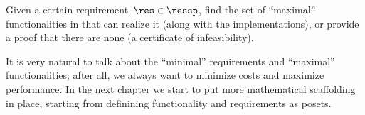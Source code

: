 \begin{problem}[FixReqMinFun]\label{pro:FixReqMinFun}
    Given a certain requirement~$\res\in\ressp$, find the set of ``maximal'' functionalities in that can realize it (along with the implementations), or provide a proof that there are none (a certificate of infeasibility).
\end{problem}

It is very natural to talk about the ``minimal'' requirements and ``maximal'' functionalities;
after all, we always want to minimize costs and maximize performance. In the next chapter
we start to put more mathematical scaffolding in place, starting from definining functionality
and requirements as posets.



